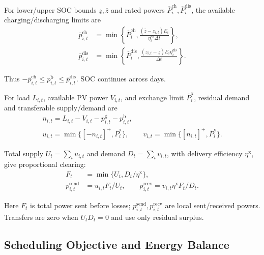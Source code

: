 For lower/upper SOC bounds $\underline{z},\overline{z}$ and rated powers
$\overline{P}_i^{\mathrm{ch}},\overline{P}_i^{\mathrm{dis}}$,
the available charging/discharging limits are
\begin{equation}
 \begin{aligned}
 \overline{p}_{i,t}^{\mathrm{ch}}
 &=\min\left\{\overline{P}_i^{\mathrm{ch}},
       \frac{(\overline{z}-z_{i,t})E_i}
            {\eta_i^{\mathrm{ch}}\Delta t}\right\},\\
 \overline{p}_{i,t}^{\mathrm{dis}}
 &=\min\left\{\overline{P}_i^{\mathrm{dis}},
       \frac{(z_{i,t}-\underline{z})E_i\eta_i^{\mathrm{dis}}}
            {\Delta t}\right\}.
 \end{aligned}
 \label{eq:battery-limits}
\end{equation}

Thus $-\overline{p}_{i,t}^{\mathrm{ch}}\leq p_{i,t}^{\mathrm{b}}
\leq\overline{p}_{i,t}^{\mathrm{dis}}$. SOC continues across days.

For load $L_{i,t}$, available PV power $V_{i,t}$, and exchange limit
$\overline{P}_i^{\mathrm{x}}$, residual demand and transferable
supply/demand are
\begin{gather}
 n_{i,t}=L_{i,t}-V_{i,t}-p_{i,t}^{\mathrm{g}}-p_{i,t}^{\mathrm{b}},
 \label{eq:residual-demand}\\
 u_{i,t}=\min\{[-n_{i,t}]^+,\overline{P}_i^{\mathrm{x}}\},\qquad
 v_{i,t}=\min\{[n_{i,t}]^+,\overline{P}_i^{\mathrm{x}}\}.
 \label{eq:exchange-offers}
\end{gather}

Total supply $U_t=\sum_i u_{i,t}$ and demand $D_t=\sum_i v_{i,t}$,
with delivery efficiency $\eta^{\mathrm{x}}$, give proportional clearing:
\begin{equation}
 \begin{aligned}
 F_t&=\min\{U_t,D_t/\eta^{\mathrm{x}}\},\\
 p_{i,t}^{\mathrm{send}}&=u_{i,t}F_t/U_t,\qquad
 p_{i,t}^{\mathrm{recv}}=v_{i,t}\eta^{\mathrm{x}}F_t/D_t .
 \end{aligned}
 \label{eq:proportional-exchange}
\end{equation}

Here $F_t$ is total power sent before losses;
$p_{i,t}^{\mathrm{send}},p_{i,t}^{\mathrm{recv}}$ are local sent/received
powers. Transfers are zero when $U_tD_t=0$ and use only residual surplus.

\subsection{Scheduling Objective and Energy Balance}
\label{sec:objective}

